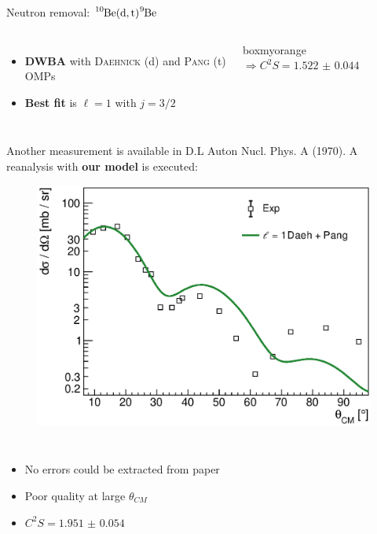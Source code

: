 \documentclass[sans,
frameno, %
mp,
usenames,dvipsnames, %
onlytextwidth, %
t,%
11pt]{beamer}
\newcommand{\iso}[2]{\ce{^{#1}#2}}
\begin{document}
\begin{frame}{Neutron removal: $\iso{10}{Be}(\textrm{d}, \textrm{t})\iso{9}{Be}$}
{\begin{figure}
\begin{minipage}[t]{0.48\linewidth}
            \end{minipage}
        \end{figure}
        \medskip
        \begin{columns}[c]
            {
                \begin{itemize}
                    \item \textbf{DWBA} with \textsc{Daehnick} (d) and \textsc{Pang} (t) OMPs
                    \item \textbf{Best fit} is $\ell = 1$ with $j = 3/2$
                \end{itemize}
            }\hfill
            {

                \begin{beamercolorbox}[sep=1ex, center, rounded=true]{boxmyorange}
                    $\Rightarrow C^2S = \qty{1.522(44)}{}$
                \end{beamercolorbox}

            }
        \end{columns}

    }
    \only<+>
    {
        \addtocounter{framenumber}{1}
        Another measurement is available in {\small D.L Auton Nucl. Phys. A (1970)}. A reanalysis with \textbf{our model} is executed:

        \begin{figure}
            \centering
            \includegraphics[width=0.5\linewidth]{figures/Workshop/auton.eps}
        \end{figure}
        \medskip
        \begin{columns}[c]
            {
                \begin{itemize}
                    \item No errors could be extracted from paper
                    \item Poor quality at large $\theta_{CM}$
                    \item $C^2S = \num{1.951(54)}$
                \end{itemize}

}
\end{columns}}
\end{frame}
\end{document}

